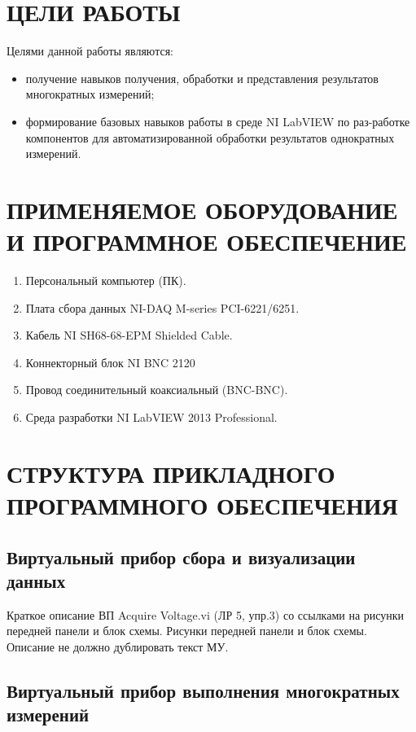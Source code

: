 \documentclass[a4paper,14pt]{article}
\begin{document}

\tableofcontents
\pagebreak

\section{ЦЕЛИ РАБОТЫ}
Целями данной работы являются:

\begin{itemize}
	\item получение навыков получения, обработки и представления результатов многократных измерений;
	\item формирование базовых навыков работы в среде NI LabVIEW по раз-работке компонентов для автоматизированной обработки результатов однократных измерений.
\end{itemize}

\section{ПРИМЕНЯЕМОЕ ОБОРУДОВАНИЕ И ПРОГРАММНОЕ ОБЕСПЕЧЕНИЕ}

\begin{enumerate}
	\item	Персональный компьютер (ПК).
	\item	Плата сбора данных NI-DAQ M-series PCI-6221/6251.
	\item	Кабель NI SH68-68-EPM Shielded Cable.
	\item	Коннекторный блок NI BNC 2120 
	\item	Провод соединительный коаксиальный (BNC-BNC).
	\item	Среда разработки NI LabVIEW 2013 Professional.
\end{enumerate}


\section{СТРУКТУРА ПРИКЛАДНОГО 	ПРОГРАММНОГО ОБЕСПЕЧЕНИЯ}
\subsection{Виртуальный прибор сбора и визуализации данных}
Краткое описание ВП Acquire Voltage.vi (ЛР 5, упр.3) со ссылками на рисунки передней панели и блок схемы. Рисунки передней панели и блок схемы. Описание не должно дублировать текст МУ.
\subsection{Виртуальный прибор выполнения многократных измерений }
\end{document}

